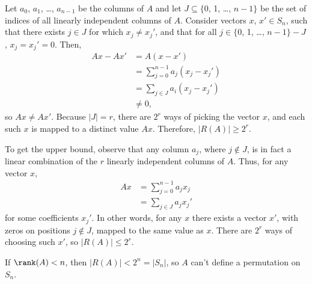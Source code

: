 Let $a_0$, $a_1$, \dots, $a_{n-1}$ be the columns of $A$ and let $J\subseteq\{0$, 1, \dots, $n-1\}$ be the set of indices of all linearly independent columns of $A$.
Consider vectors $x$, $x'\in S_n$, such that there exists $j\in J$ for which $x_j\ne x_j'$, and that for all $j\in\{0$, 1, \dots, $n-1\}-J$, $x_j=x_j'=0$.
Then,
\begin{align*}
    Ax-Ax' &= A(x-x') \\
    &= \sum_{j=0}^{n-1}a_j(x_j-x_j') \\
    &= \sum_{j\in J}a_i(x_j-x_j') \\
    & \ne 0,
\end{align*}
so $Ax\ne Ax'$.
Because $|J|=r$, there are $2^r$ ways of picking the vector $x$, and each such $x$ is mapped to a distinct value $Ax$.
Therefore, $|R(A)|\ge2^r$.

To get the upper bound, observe that any column $a_j$, where $j\notin J$, is in fact a linear combination of the $r$ linearly independent columns of $A$.
Thus, for any vector $x$,
\begin{align*}
    Ax &= \sum_{j=0}^{n-1}a_jx_j \\
    &= \sum_{j\in J}a_jx_j'
\end{align*}
for some coefficients $x_j'$.
In other words, for any $x$ there exists a vector $x'$, with zeros on positions $j\notin J$, mapped to the same value as $x$.
There are $2^r$ ways of choosing such $x'$, so $|R(A)|\le2^r$.

If $\rank(A)<n$, then $|R(A)|<2^n=|S_n|$, so $A$ can't define a permutation on $S_n$.

